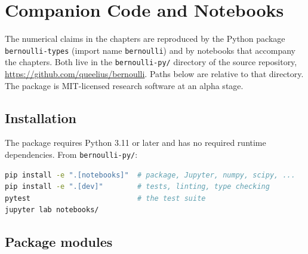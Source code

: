 \chapter{Companion Code and Notebooks}
\label{app:companion}

The numerical claims in the chapters are reproduced by the Python package
\texttt{bernoulli-types} (import name \texttt{bernoulli}) and by notebooks that
accompany the chapters. Both live in the \texttt{bernoulli-py/} directory of the
source repository, \url{https://github.com/queelius/bernoulli}. Paths below are
relative to that directory. The package is MIT-licensed research software at an
alpha stage.

\section*{Installation}

The package requires Python 3.11 or later and has no required runtime
dependencies. From \texttt{bernoulli-py/}:
\begin{lstlisting}[language=bash,numbers=none]
pip install -e ".[notebooks]"  # package, Jupyter, numpy, scipy, ...
pip install -e ".[dev]"        # tests, linting, type checking
pytest                         # the test suite
jupyter lab notebooks/
\end{lstlisting}

\section*{Package modules}

